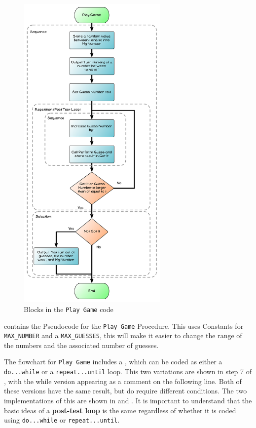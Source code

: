 \begin{figure}[htbp]
   \centering
   \includegraphics[width=0.65\textwidth]{./topics/control-flow/diagrams/PlayGame1} 
   \caption{Blocks in the \texttt{Play Game} code}
   \label{fig:play-game-1}
\end{figure}

\clearpage

 contains the Pseudocode for the \texttt{Play Game} Procedure. This uses Constants for \texttt{MAX\_NUMBER} and a \texttt{MAX\_GUESSES}, this will make it easier to change the range of the numbers and the associated number of guesses.

The flowchart for \texttt{Play Game} includes a , which can be coded as either a \texttt{do...while} or a \texttt{repeat...until} loop. This two variations are shown in step 7 of , with the while version appearing as a comment on the following line. Both of these versions have the same result, but do require different conditions. The two implementations of this are shown in  and . It is important to understand that the basic ideas of a \textbf{post-test loop} is the same regardless of whether it is coded using \texttt{do...while} or \texttt{repeat...until}.

